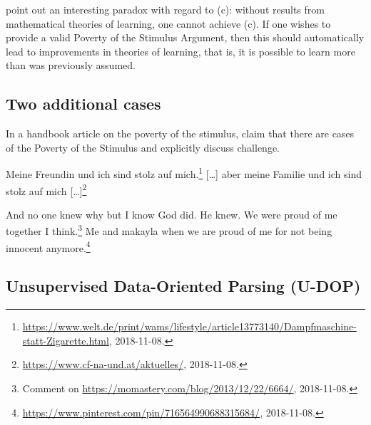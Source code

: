\citet[]{PS2002a} point out an interesting paradox with regard to (c):
without results from mathematical theories of learning, one cannot achieve (c). If one wishes to provide a valid
Poverty of the Stimulus Argument, then this should automatically lead to improvements in theories of learning, that is, it is possible
to learn more than was previously assumed.

\subsection{Two additional cases}

In a handbook article on the poverty of the stimulus, \citet{LL2016a} claim that there are cases of
the Poverty of the Stimulus and explicitly discuss  challenge.

\eal
\ex Meine Freundin und ich sind stolz auf mich.\footnote{%
\url{https://www.welt.de/print/wams/lifestyle/article13773140/Dampfmaschine-statt-Zigarette.html}, 2018-11-08.}
\ex {}[\ldots] aber meine Familie und ich sind stolz auf mich [\ldots]\footnote{%
  \url{https://www.cf-na-und.at/aktuelles/}, 2018-11-08.}
\zl

\eal
\ex And no one knew why but I know God did. He knew. We were proud of me together I think.\footnote{%
Comment on \url{https://momastery.com/blog/2013/12/22/6664/}, 2018-11-08.}
\ex Me and makayla when we are proud of me for not being innocent anymore.\footnote{%
\url{https://www.pinterest.com/pin/716564990688315684/}, 2018-11-08.}
\zl


\subsection{Unsupervised Data-Oriented Parsing (U-DOP)}
\label{Abschnitt-UDOP}

